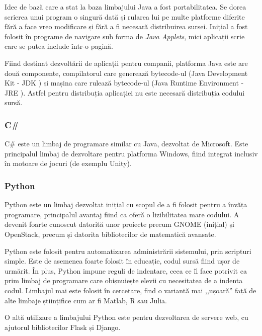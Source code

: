 Idee de bază care a stat la baza limbajului Java a fost portabilitatea. Se dorea
scrierea unui program o singură dată și rularea lui pe multe platforme diferite
fără a face vreo modificare și fără a fi necesară distribuirea sursei. Inițial a
fost folosit în programe de navigare sub forma de \textit{Java Applets}, mici
aplicații scrie care se putea include într-o pagină.

Fiind destinat dezvoltării de aplicații pentru companii, platforma Java este are
două componente, compilatorul care generează bytecode-ul (Java Development Kit -
JDK ) și mașina care rulează bytecode-ul (Java
Runtime Environment - JRE ). Astfel pentru
distribuția aplicației nu este necesară distribuția codului sursă.

\subsubsection{C\#}
\label{sec:appdev:hybrid-lang:csharp}

C\# este un limbaj de programare similar cu Java, dezvoltat de Microsoft. Este
principalul limbaj de dezvoltare pentru platforma Windows, fiind integrat
inclusiv în motoare de jocuri (de exemplu Unity).

\subsubsection{Python}
\label{sec:appdev:hybrid-lang:python}

Python este un limbaj dezvoltat inițial cu scopul de a fi folosit pentru a
învăța programare, principalul avantaj fiind ca oferă o lizibilitatea mare
codului. A devenit foarte cunoscut datorită unor proiecte precum GNOME (inițial)
și OpenStack, precum și datorita bibliotecilor de matematică avansate.

Python este folosit pentru automatizarea administrării sistemului, prin
scripturi simple. Este de asemenea foarte folosit în educație, codul sursă fiind
ușor de urmărit. În plus, Python impune reguli de indentare, ceea ce îl face
potrivit ca prim limbaj de programare care obișnuiește elevii cu necesitatea de
a indenta codul. Limbajul mai este folosit în cercetare, find o variantă mai
,,ușoară'' față de alte limbaje științifice cum ar fi Matlab, R sau Julia.

O altă utilizare a limbajului Python este pentru dezvoltarea de servere web, cu
ajutorul bibliotecilor Flask și Django.

